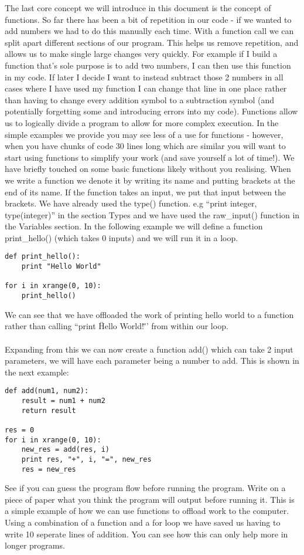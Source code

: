 \documentclass[twocolumn]{article}
\begin{document}
The last core concept we will introduce in this document is the concept of functions. So far there has been a bit of repetition in our code - if we wanted to add numbers we had to do this manually each time. With a function call we can split apart different sections of our program. This helps us remove repetition, and allows us to make single large changes very quickly. For example if I build a function that's sole purpose is to add two numbers, I can then use this function in my code. If later I decide I want to instead subtract those 2 numbers in all cases where I have used my function I can change that line in one place rather than having to change every addition symbol to a subtraction symbol (and potentially forgetting some and introducing errors into my code). Functions allow us to logically divide a program to allow for more complex execution. In the simple examples we provide you may see less of a use for functions - however, when you have chunks of code 30 lines long which are similar you will want to start using functions to simplify your work (and save yourself a lot of time!). We have briefly touched on some basic functions likely without you realising. When we write a function we denote it by writing its name and putting brackets at the end of its name. If the function takes an input, we put that input between the brackets. We have already used the type() function. e.g ``print integer, type(integer)'' in the section Types and we have used the raw\_input() function in the Variables section. In the following example we will define a function print\_hello() (which takes 0 inputs) and we will run it in a loop.
\begin{lstlisting}
def print_hello():
	print "Hello World"

for i in xrange(0, 10):
	print_hello()
\end{lstlisting}
We can see that we have offloaded the work of printing hello world to a function rather than calling ``print \"Hello World!\"'' from within our loop.\\
\\
Expanding from this we can now create a function add() which can take 2 input parameters, we will have each parameter being a number to add. This is shown in the next example:
\begin{lstlisting}
def add(num1, num2):
	result = num1 + num2
	return result

res = 0
for i in xrange(0, 10):
	new_res = add(res, i)
	print res, "+", i, "=", new_res
	res = new_res
\end{lstlisting}
See if you can guess the program flow before running the program. Write on a piece of paper what you think the program will output before running it. This is a simple example of how we can use functions to offload work to the computer. Using a combination of a function and a for loop we have saved us having to write 10 seperate lines of addition. You can see how this can only help more in longer programs.
\end{document}
